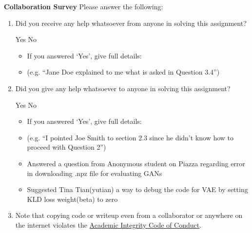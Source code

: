\documentclass[11pt,addpoints,answers]{exam}
\numberwithin{equation}{section} %
\numberwithin{figure}{section} %
\numberwithin{table}{section} %
\begin{document}
\clearpage

\textbf{Collaboration Survey} Please answer the following:

\begin{enumerate}
    \item Did you receive any help whatsoever from anyone in solving this assignment?
    \begin{checkboxes}
     \choice Yes
     \CorrectChoice No
    \end{checkboxes}
    \begin{itemize}
        \item If you answered `Yes', give full details:
        \item (e.g. “Jane Doe explained to me what is asked in Question 3.4”)
    \end{itemize}

    \begin{tcolorbox}[fit,height=3cm,blank, borderline={1pt}{-2pt},nobeforeafter]
    \end{tcolorbox}

    \item Did you give any help whatsoever to anyone in solving this assignment?
    \begin{checkboxes}
     \CorrectChoice Yes
     \choice No\
    \end{checkboxes}
    \begin{itemize}
        \item If you answered `Yes', give full details:
        \item (e.g. “I pointed Joe Smith to section 2.3 since he didn’t know how to proceed with Question 2”)
    \end{itemize}

    \begin{tcolorbox}[fit,height=3cm,blank, borderline={1pt}{-2pt},nobeforeafter]
    \begin{itemize}
        \item Answered a question from Anonymous student on Piazza regarding error in downloading .npz file for evaluating GANs
        \item Suggested Tina Tian(yutian) a way to debug the code for VAE by setting KLD loss weight(beta) to zero
    \end{itemize}
\end{tcolorbox}

    \item Note that copying code or writeup even from a collaborator or anywhere on the internet violates the \href{hhttps://www.cmu.edu/policies/student-and-student-life/academic-integrity.html}{Academic Integrity Code of Conduct}.
\end{enumerate}
\end{document}
